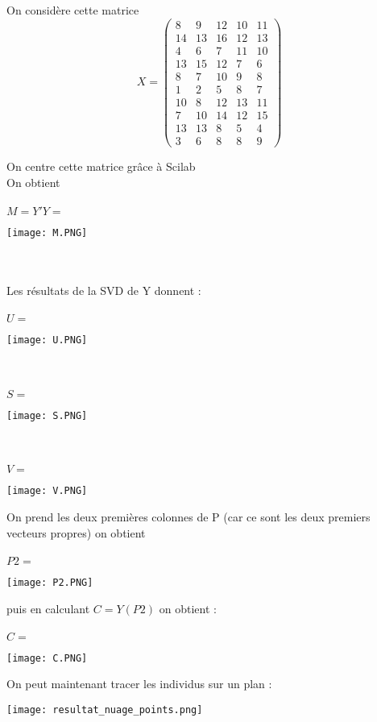 \documentclass{article}
\begin{document}
On considère cette matrice
$$ X = \left( \begin{matrix} 8 & 9 & 12 & 10 & 11\\ 
                             14 & 13 & 16 & 12 & 13 \\ 
                             4 & 6 & 7 & 11 & 10  \\ 
                             13 & 15 & 12 & 7 & 6 \\ 
                             8 & 7 & 10 & 9 & 8  \\ 
                             1 & 2 & 5 & 8 & 7 \\ 
                             10 & 8 & 12 & 13 & 11  \\ 
                             7 & 10 & 14 & 12 & 15 \\ 
                             13 & 13 & 8 & 5 & 4 \\
                             3 & 6 & 8 & 8 & 9 \end{matrix} \right) $$

On centre cette matrice grâce à Scilab 
\\
On obtient \\\\    $M = Y'Y = $
\begin{center}

    \texttt{[image: M.PNG]}
\end{center}
\\
\\
Les résultats de la SVD de Y donnent :\\\\    $U  = $
\begin{center}

    \texttt{[image: U.PNG]}
\end{center}\\\\
    $S  = $
\begin{center}

    \texttt{[image: S.PNG]}
\end{center}\\\\
    $V  = $
\begin{center}

    \texttt{[image: V.PNG]}
\end{center}

On prend les deux premières colonnes de P (car ce sont les deux premiers vecteurs propres) on obtient \\\\$P2 = $
\begin{center}
    \texttt{[image: P2.PNG]}
\end{center}

puis en calculant $C = Y(P2)$ on obtient : \\\\
    $C  = $
\begin{center}
    \texttt{[image: C.PNG]}
\end{center}

On peut maintenant tracer les individus sur un plan : 
\begin{center}
    \texttt{[image: resultat\_nuage\_points.png]}
\end{center}
\end{document}
